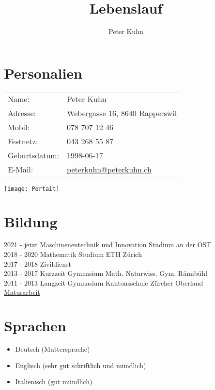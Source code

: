 \documentclass[a4paper,12pt]{article}
\title{Lebenslauf}
\author{Peter Kuhn}
\date{}
\begin{document}
\maketitle

\begin{minipage}{0.7\textwidth}
\section*{Personalien}
\begin{tabular}{ll}
Name: & Peter Kuhn \\
Adresse: & Webergasse 16, 8640 Rapperswil \\
Mobil: & 078 707 12 46 \\
Festnetz: & 043 268 55 87 \\
Geburtsdatum: & 1998-06-17\\
E-Mail: & \href{mailto:peterkuhn@peterkuhn.ch}{peterkuhn@peterkuhn.ch} \\
\end{tabular}
\end{minipage}
\hfill
\begin{minipage}{0.25\textwidth}
    \texttt{[image: Portait]}
\end{minipage}

\section*{Bildung}

2021 - jetzt Maschinenentechnik und Innovation Studium an der OST\\
2018 - 2020 Mathematik Studium ETH Zürich\\
2017 - 2018 Zivildienst\\
2013 - 2017 Kurzzeit Gymnasium Math. Naturwiss. Gym. Rämibühl\\
2011 - 2013 Langzeit Gymnasium Kantonsschule Zürcher Oberland\\



\href{http://peterkuhn.ch/Maturarbeit20170120.pdf}{Maturarbeit}

\section*{Sprachen}
\begin{itemize}
    \item Deutsch (Muttersprache)
    \item Englisch (sehr gut schriftlich und mündlich)
    \item Italienisch (gut mündlich)
\end{itemize}
\end{document}
